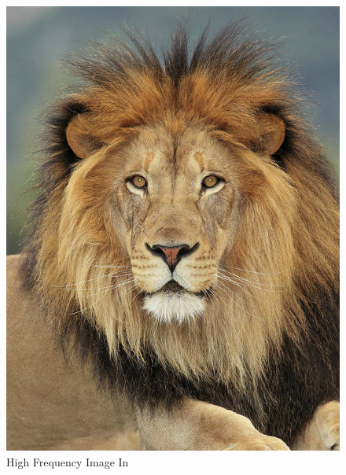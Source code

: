 \documentclass{article}
\begin{document}
\begin{figure}[!htb]
    \includegraphics[width=\linewidth]{lion.jpeg}
    \caption{High Frequency Image In}\label{fig:awesome_image2}
\endminipage
{}

\end{figure}
\end{document}

